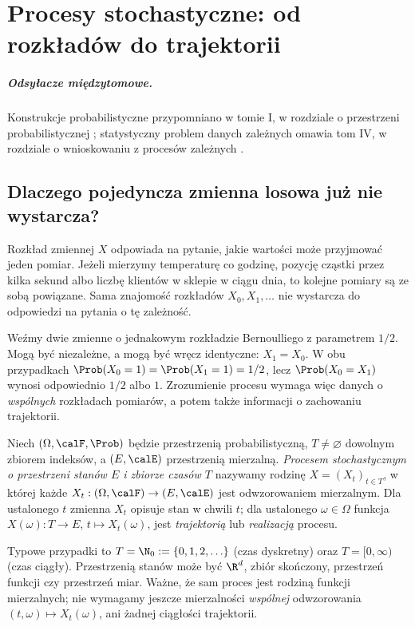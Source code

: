 \chapter{Procesy stochastyczne: od rozkładów do trajektorii}
\label{ch:procesy}
\paragraph{Odsyłacze międzytomowe.}
Konstrukcje probabilistyczne przypomniano w tomie I,
w rozdziale o przestrzeni probabilistycznej%
;
statystyczny problem danych zależnych omawia tom IV,
w rozdziale o wnioskowaniu z procesów zależnych%
.


\section{Dlaczego pojedyncza zmienna losowa już nie wystarcza?}
Rozkład zmiennej $X$ odpowiada na pytanie, jakie wartości może przyjmować
jeden pomiar. Jeżeli mierzymy temperaturę co godzinę, pozycję cząstki
przez kilka sekund albo liczbę klientów w sklepie w ciągu dnia, to
kolejne pomiary są ze sobą powiązane. Sama znajomość rozkładów
$X_0,X_1,\ldots$ nie wystarcza do odpowiedzi na pytania o tę zależność.

Weźmy dwie zmienne o jednakowym rozkładzie Bernoulliego z parametrem
$1/2$. Mogą być niezależne, a mogą być wręcz identyczne: $X_1=X_0$.
W obu przypadkach $\Prob(X_0=1)=\Prob(X_1=1)=1/2$, lecz
$\Prob(X_0=X_1)$ wynosi odpowiednio $1/2$ albo $1$.
Zrozumienie procesu wymaga więc danych o \emph{wspólnych} rozkładach
pomiarów, a potem także informacji o zachowaniu trajektorii.

\begin{definicja}
Niech $(\Omega,\calF,\Prob)$ będzie przestrzenią probabilistyczną,
$T\ne\varnothing$ dowolnym zbiorem indeksów, a $(E,\calE)$
przestrzenią mierzalną. \emph{Procesem stochastycznym o przestrzeni
stanów $E$ i zbiorze czasów $T$} nazywamy rodzinę
$X=(X_t)_{t\in T}$, w której każde
$X_t:(\Omega,\calF)\to(E,\calE)$ jest odwzorowaniem mierzalnym.
Dla ustalonego $t$ zmienna $X_t$ opisuje stan w chwili $t$;
dla ustalonego $\omega\in\Omega$ funkcja
$X(\omega):T\to E$, $t\mapsto X_t(\omega)$, jest
\emph{trajektorią} lub \emph{realizacją} procesu.
\end{definicja}

Typowe przypadki to $T=\N_0:=\{0,1,2,\ldots\}$ (czas dyskretny)
oraz $T=[0,\infty)$ (czas ciągły). Przestrzenią stanów może być
$\R^d$, zbiór skończony, przestrzeń funkcji czy przestrzeń miar.
Ważne, że sam proces jest rodziną funkcji mierzalnych; nie
wymagamy jeszcze mierzalności \emph{wspólnej} odwzorowania
$(t,\omega)\mapsto X_t(\omega)$, ani żadnej ciągłości trajektorii.

